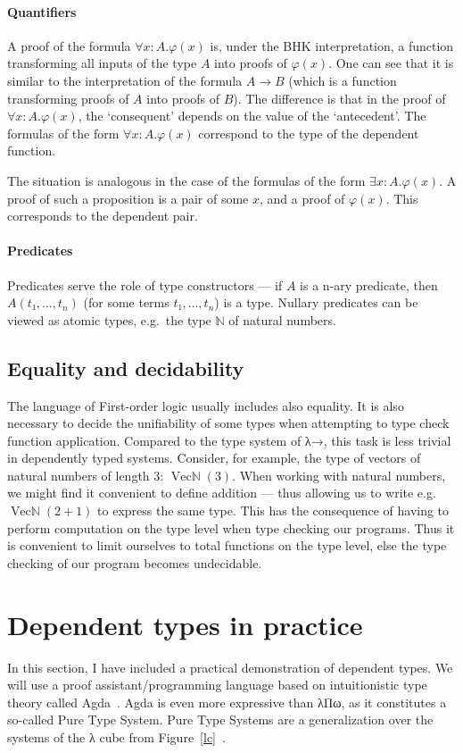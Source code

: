 \documentclass[12pt]{article}
\begin{document}
\paragraph{Quantifiers}
A proof of the formula $∀x:A.φ(x)$ is, under the BHK interpretation, a function transforming all inputs of the type $A$ into proofs of $φ(x)$. One can see that it is similar to the interpretation of the formula $A → B$ (which is a function transforming proofs of $A$ into proofs of $B$). The difference is that in the proof of $∀x:A.φ(x)$, the `consequent' depends on the value of the `antecedent'. The formulas of the form $∀x:A.φ(x)$ correspond to the type of the dependent function.

The situation is analogous in the case of the formulas of the form $∃x:A.φ(x)$. A proof of such a proposition is a pair of some $x$, and a proof of $φ(x)$. This corresponds to the dependent pair.

\paragraph{Predicates}
Predicates serve the role of type constructors — if $A$ is a n-ary predicate, then $A(t₁, …, t_n)$ (for some terms $t₁, …, t_n$) is a type. Nullary predicates can be viewed as atomic types, e.g.~the type $ℕ$ of natural numbers.

\subsection{Equality and decidability}
The language of First-order logic usually includes also equality. It is also necessary to decide the unifiability of some types when attempting to type check function application. Compared to the type system of λ→, this task is less trivial in dependently typed systems. Consider, for example, the type of vectors of natural numbers of length 3: $\operatorname{Vecℕ}(3)$. When working with natural numbers, we might find it convenient to define addition — thus allowing us to write e.g.~$\operatorname{Vecℕ}(2 + 1)$ to express the same type. This has the consequence of having to perform computation on the type level when type checking our programs. Thus it is convenient to limit ourselves to total functions on the type level, else the type checking of our program becomes undecidable.

\section{Dependent types in practice}
In this section, I have included a practical demonstration of dependent types. We will use a proof assistant/programming language based on intuitionistic type theory called Agda~\cite{norell2007towards}. Agda is even more expressive than λΠω, as it constitutes a so-called Pure Type System. Pure Type Systems are a generalization over the systems of the λ cube from Figure~\ref{lc}~\cite{sorensen2006lectures}.
\end{document}
